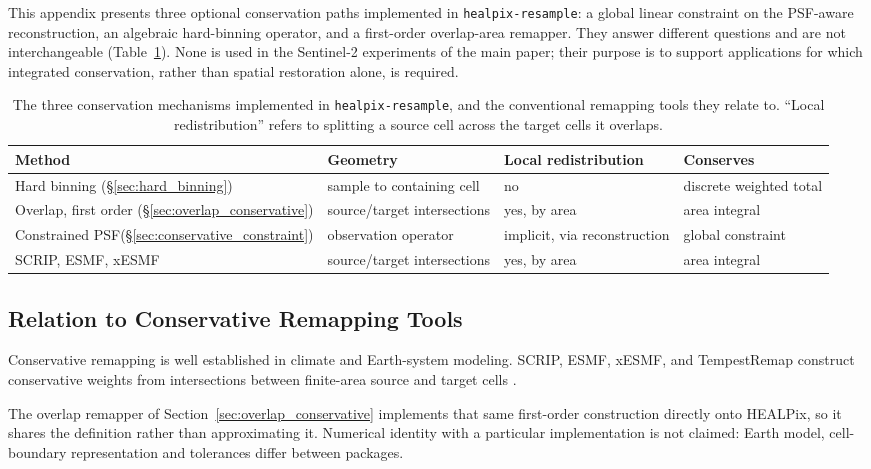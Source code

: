 \documentclass[journal]{IEEEtran}
\newcommand{\healpix}{HEALPix\xspace}
\newcommand{\psf}{PSF\xspace}
\begin{document}
This appendix presents three optional conservation paths
implemented in \texttt{healpix-resample}: a global linear
constraint on the \psf-aware reconstruction, an algebraic
hard-binning operator, and a first-order overlap-area remapper.
They answer different questions and are not interchangeable
(Table~\ref{tab:conservation_mechanisms}). None is used in the
Sentinel-2 experiments of the main paper; their purpose is to
support applications for which integrated conservation, rather
than spatial restoration alone, is required.

\begin{table}[t]
\centering
\caption{The three conservation mechanisms implemented in
\texttt{healpix-resample}, and the conventional remapping tools
they relate to. ``Local redistribution'' refers to splitting a
source cell across the target cells it overlaps.}
\label{tab:conservation_mechanisms}
\footnotesize
\begin{tabular}{@{}p{1.45cm}p{1.7cm}p{1.35cm}p{1.5cm}@{}}
\toprule
Method & Geometry & Local redistribution & Conserves \\
\midrule
Hard binning (\S\ref{sec:hard_binning}) & sample to containing cell & no & discrete weighted total \\
Overlap, first order (\S\ref{sec:overlap_conservative}) & source/target intersections & yes, by area & area integral \\
Constrained \psf (\S\ref{sec:conservative_constraint}) & observation operator & implicit, via reconstruction & global constraint \\
\midrule
SCRIP, ESMF, xESMF & source/target intersections & yes, by area & area integral \\
\bottomrule
\end{tabular}
\end{table}


\subsection{Relation to Conservative Remapping Tools}
\label{sec:related_conservative}

Conservative remapping is well established in climate and
Earth-system modeling. SCRIP, ESMF, xESMF, and TempestRemap
construct conservative weights from intersections between
finite-area source and target cells
\cite{jones1999scrip,hill2004esmf,zhuang2020xesmf,
ullrich2015tempestremap}.

The overlap remapper of
Section~\ref{sec:overlap_conservative} implements that same
first-order construction directly onto \healpix, so it shares the
definition rather than approximating it. Numerical identity with a
particular implementation is not claimed: Earth model,
cell-boundary representation and tolerances differ between
packages.
\end{document}
